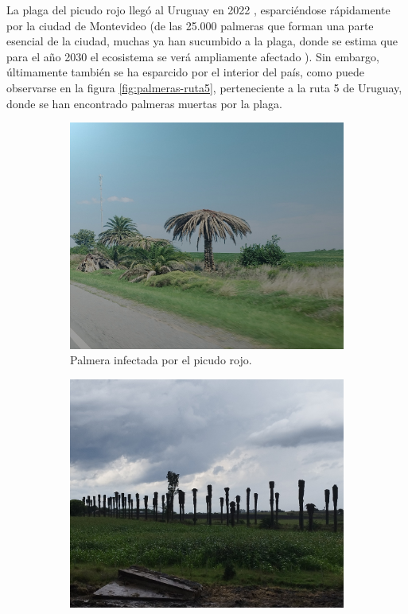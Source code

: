 La plaga del picudo rojo llegó al Uruguay en 2022 , esparciéndose rápidamente por la ciudad de Montevideo (de las 25.000 palmeras que forman una parte esencial de la ciudad, muchas ya han sucumbido a la plaga, donde se estima que para el año 2030 el ecosistema se verá ampliamente afectado ). Sin embargo, últimamente también se ha esparcido por el interior del país, como puede observarse en la figura \ref{fig:palmeras-ruta5}, perteneciente a la ruta 5 de Uruguay, donde se han encontrado palmeras muertas por la plaga.

\begin{figure}[!htpb]
  \centering
  \begin{subfigure}[b]{0.49\textwidth}
    \centering
    \includegraphics[width=\textwidth]{./Figures/palmera-infectada.jpg}
    \caption{Palmera infectada por el picudo rojo.}
    \label{fig:palmera-infectada}
  \end{subfigure}
  \hfill
  \begin{subfigure}[b]{0.49\textwidth}
    \centering
    \includegraphics[width=.99\textwidth]{./Figures/palmeras-ruta5.jpg}

\end{subfigure}
\end{figure}
